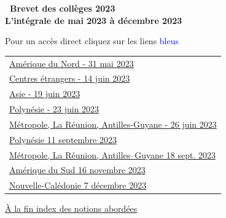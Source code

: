 \documentclass[11pt]{article}
\begin{document}
\setlength\parindent{0mm}

\pagestyle{fancy}
\thispagestyle{empty}
\begin{center} {\Large \textbf{\decofourleft~Brevet des collèges 2023~\decofourright\\\vspace{1cm} L'intégrale de mai 2023 à décembre 2023}}

\vspace{1cm}

Pour un accès direct cliquez sur les liens {\Large \textcolor{blue}{bleus}}
\end{center}

 \label{sommaire}
 \hypertarget{sommaire}{}
 
\begin{tabularx}{\linewidth}{>{\Large}X}

\hyperlink{AmeriqueduNord}{Amérique du Nord - 31 mai 2023}\dotfill \pageref{AmeriqueduNord} \\
\hyperlink{Etranger}{Centres étrangers - 14 juin 2023} \dotfill \pageref{Etranger} \\
\hyperlink{Asie}{Asie - 19 juin 2023} \dotfill \pageref{Asie} \\
\hyperlink{Polynesie}{Polynésie - 23 juin 2023} \dotfill \pageref{Polynesie} \\
\hyperlink{Metropole}{Métropole, La Réunion, Antilles-Guyane - 26 juin 2023} \dotfill \pageref{Metropole}\\
\hyperlink{Polynesiesep}{Polynésie 11 septembre 2023} \dotfill \pageref{Polynesiesep} \\
\hyperlink{Metropolesep}{Métropole, La Réunion, Antilles--Guyane 18 sept. 2023} \dotfill \pageref{Metropolesep} \\
\hyperlink{AmeriqueSud}{Amérique du Sud 16 novembre 2023}  \dotfill \pageref{AmeriqueSud} \\
\hyperlink{Caledoniedec}{Nouvelle-Calédonie 7 décembre 2023}  \dotfill \pageref{Caledoniedec}
\end{tabularx}

\vspace{1cm}

\hyperlink{Index}{À la fin index des notions abordées}


\newpage
 ~
\newpage

	\pagestyle{fancy}
	\thispagestyle{empty}
\end{document}
